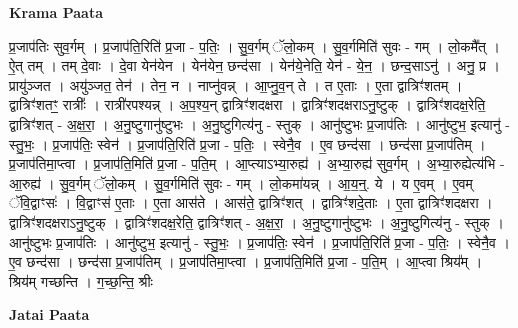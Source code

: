 \documentclass[17pt]{extarticle}
\begin{document}
\textbf{Krama Paata} \newline

प्र॒जाप॑तिः सुव॒र्गम् । प्र॒जाप॑ति॒रिति॑ प्र॒जा - प॒तिः॒ । सु॒व॒र्गम् ॅलो॒कम् । सु॒व॒र्गमिति॑ सुवः - गम् । लो॒कमै᳚त् । ऐ॒त् तम् । तम् दे॒वाः । दे॒वा येन॑येन । येन॑येन॒ छन्द॑सा । येन॑ये॒नेति॒ येन॑ - ये॒न॒ । छन्द॒साऽनु॑ । अनु॒ प्र । प्रायु॑ञ्जत । अयु॑ञ्जत॒ तेन॑ । तेन॒ न । नाप्नु॑वन्न् । आ॒प्नु॒व॒न् ते । त ए॒ताः । ए॒ता द्वात्रिꣳ॑शतम् । द्वात्रिꣳ॑शतꣳ॒॒ रात्रीः᳚ । रात्री॑रपश्यन्न् । अ॒प॒श्य॒न् द्वात्रिꣳ॑शदक्षरा । द्वात्रिꣳ॑शदक्षराऽनु॒ष्टुक् । द्वात्रिꣳ॑शदक्ष॒रेति॒ द्वात्रिꣳ॑शत् - अ॒क्ष॒रा॒ । अ॒नु॒ष्टुगानु॑ष्टुभः । अ॒नु॒ष्टुगित्य॑नु - स्तुक् । आनु॑ष्टुभः प्र॒जाप॑तिः । आनु॑ष्टुभ॒ इत्यानु॑ - स्तु॒भः॒ । प्र॒जाप॑तिः॒ स्वेन॑ । प्र॒जाप॑ति॒रिति॑ प्र॒जा - प॒तिः॒ । स्वेनै॒व । ए॒व छन्द॑सा । छन्द॑सा प्र॒जाप॑तिम् । प्र॒जाप॑तिमा॒प्त्वा । प्र॒जाप॑ति॒मिति॑ प्र॒जा - प॒ति॒म् । आ॒प्त्याऽभ्या॒रुह्य॑ । अ॒भ्या॒रुह्य॑ सुव॒र्गम् । अ॒भ्या॒रुह्येत्य॑भि - आ॒रुह्य॑ । सु॒व॒र्गम् ॅलो॒कम् । सु॒व॒र्गमिति॑ सुवः - गम् । लो॒कमा॑यन्न् । आ॒य॒न्॒. ये । य ए॒वम् । ए॒वम् ॅवि॒द्वाꣳसः॑ । वि॒द्वाꣳस॑ ए॒ताः । ए॒ता आस॑ते । आस॑ते॒ द्वात्रिꣳ॑शत् । द्वात्रिꣳ॑शदे॒ताः । ए॒ता द्वात्रिꣳ॑शदक्षरा । द्वात्रिꣳ॑शदक्षराऽनु॒ष्टुक् । द्वात्रिꣳ॑शदक्ष॒रेति॒ द्वात्रिꣳ॑शत् - अ॒क्ष॒रा॒ । अ॒नु॒ष्टुगानु॑ष्टुभः । अ॒नु॒ष्टुगित्य॑नु - स्तुक् । आनु॑ष्टुभः प्र॒जाप॑तिः । आनु॑ष्टुभ॒ इत्यानु॑ - स्तु॒भः॒ । प्र॒जाप॑तिः॒ स्वेन॑ । प्र॒जाप॑ति॒रिति॑ प्र॒जा - प॒तिः॒ । स्वेनै॒व । ए॒व छन्द॑सा । छन्द॑सा प्र॒जाप॑तिम् । प्र॒जाप॑तिमा॒प्त्वा । प्र॒जाप॑ति॒मिति॑ प्र॒जा - प॒ति॒म् । आ॒प्त्वा श्रिय᳚म् । श्रिय॑म् गच्छन्ति । ग॒च्छ॒न्ति॒ श्रीः \newline

\textbf{Jatai Paata} \newline
\end{document}
